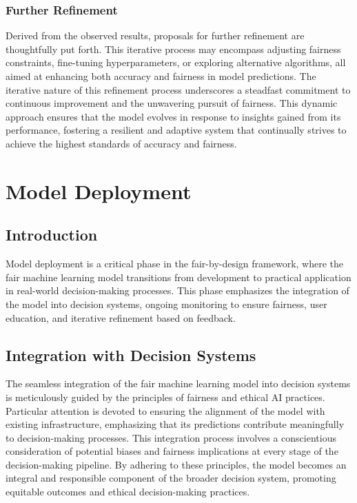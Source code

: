 \subsubsection{Further Refinement}

Derived from the observed results, proposals for further refinement are thoughtfully put forth. This iterative process may encompass adjusting fairness constraints, fine-tuning hyperparameters, or exploring alternative algorithms, all aimed at enhancing both accuracy and fairness in model predictions. The iterative nature of this refinement process underscores a steadfast commitment to continuous improvement and the unwavering pursuit of fairness. This dynamic approach ensures that the model evolves in response to insights gained from its performance, fostering a resilient and adaptive system that continually strives to achieve the highest standards of accuracy and fairness.

\section{Model Deployment}
\label{section:model-deployment}

\subsection{Introduction}

Model deployment is a critical phase in the fair-by-design framework, where the fair machine learning model transitions from development to practical application in real-world decision-making processes. This phase emphasizes the integration of the model into decision systems, ongoing monitoring to ensure fairness, user education, and iterative refinement based on feedback.

\subsection{Integration with Decision Systems}

The seamless integration of the fair machine learning model into decision systems is meticulously guided by the principles of fairness and ethical AI practices. Particular attention is devoted to ensuring the alignment of the model with existing infrastructure, emphasizing that its predictions contribute meaningfully to decision-making processes. This integration process involves a conscientious consideration of potential biases and fairness implications at every stage of the decision-making pipeline. By adhering to these principles, the model becomes an integral and responsible component of the broader decision system, promoting equitable outcomes and ethical decision-making practices.

